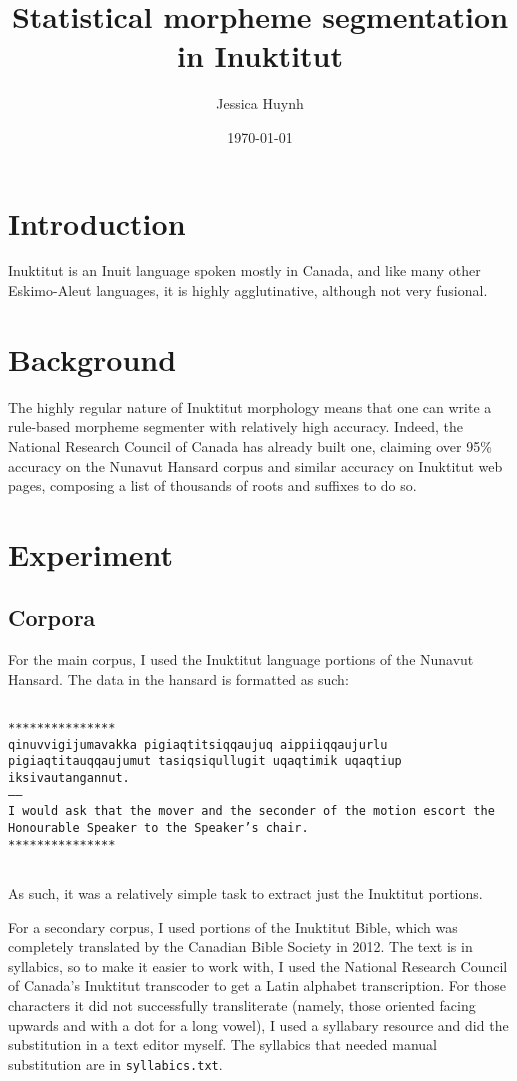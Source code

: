\documentclass[10pt]{article}
\title{Statistical morpheme segmentation in Inuktitut}
\author{Jessica Huynh}
\date{\today}
\begin{document}
	
\maketitle

\onehalfspacing

\section{Introduction}
Inuktitut is an Inuit language spoken mostly in Canada, and like many other Eskimo-Aleut languages, it is highly agglutinative, although not very fusional.\cite{syllabics}

\section{Background}
The highly regular nature of Inuktitut morphology means that one can write a rule-based morpheme segmenter with relatively high accuracy. Indeed, the National Research Council of Canada has already built one, claiming over 95\% accuracy on the Nunavut Hansard corpus and similar accuracy on Inuktitut web pages, composing a list of thousands of roots and suffixes to do so.\cite{analyzer}

\section{Experiment}

\subsection{Corpora}
For the main corpus, I used the Inuktitut language portions of the Nunavut Hansard.\cite{hansard} The data in the hansard is formatted as such:

\texttt{~\\***************\\qinuvvigijumavakka pigiaqtitsiqqaujuq aippiiqqaujurlu pigiaqtitauqqaujumut tasiqsiqullugit uqaqtimik uqaqtiup iksivautangannut.\\-----\\I would ask that the mover and the seconder of the motion escort the Honourable Speaker to the Speaker's chair.\\***************\\~}

As such, it was a relatively simple task to extract just the Inuktitut portions.

For a secondary corpus, I used portions of the Inuktitut Bible, which was completely translated by the Canadian Bible Society in 2012.\cite{bible} The text is in syllabics, so to make it easier to work with, I used the National Research Council of Canada's Inuktitut transcoder to get a Latin alphabet transcription. For those characters it did not successfully transliterate (namely, those oriented facing upwards and with a dot for a long vowel), I used a syllabary resource\cite{syllabics} and did the substitution in a text editor myself. The syllabics that needed manual substitution are in \texttt{syllabics.txt}.
\end{document}
